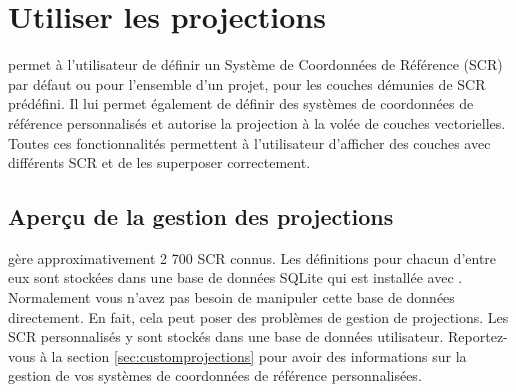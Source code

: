 \chapter{Utiliser les projections}\label{label_projections}


\qg permet à l'utilisateur de définir un Système de Coordonnées de Référence  (SCR) par défaut ou pour l'ensemble d'un projet, pour les couches démunies de  SCR prédéfini. Il lui permet également de définir des systèmes de coordonnées  de référence personnalisés et autorise la projection à la volée de couches  vectorielles. Toutes ces fonctionnalités permettent à l'utilisateur d'afficher  des couches avec différents SCR et de les superposer correctement.

\section{Aperçu de la gestion des projections}\label{label_projoverview}

\qg gère approximativement 2 700 SCR connus. Les définitions pour chacun d'entre eux sont stockées dans une base de données SQLite qui est installée avec \qg. Normalement vous n'avez pas besoin de manipuler cette  base de données directement. En fait, cela peut poser des problèmes de gestion de projections. Les SCR personnalisés y sont stockés dans une base de données utilisateur. Reportez-vous à la section \ref{sec:customprojections}  pour avoir des informations sur la gestion de vos systèmes de coordonnées de référence personnalisées.

